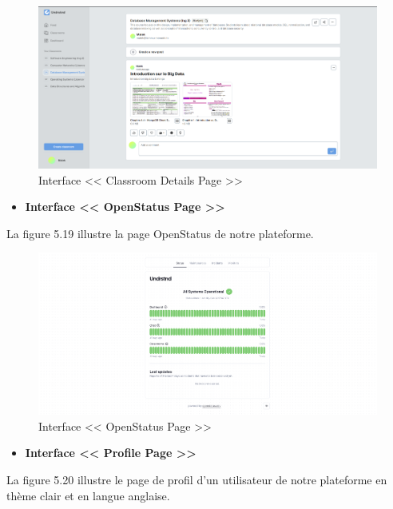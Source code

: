 \begin{figure}[H]
    \centering
    \includegraphics[width=1.1\textwidth,height=0.5\textwidth]{images/chp5/fig18.png}
    \caption{Interface << Classroom Details Page >>}
    \label{Interface << Classroom Details Page >>}    
\end{figure}
\begin{itemize}
    \item \textbf{Interface << OpenStatus Page >>}
\end{itemize}
La figure 5.19 illustre la page OpenStatus de notre plateforme.
\begin{figure}[H]
    \centering
    \includegraphics[width=1.1\textwidth,height=0.5\textwidth]{images/chp5/fig19.png}
    \caption{Interface << OpenStatus Page >>}
    \label{Interface << OpenStatus Page >>}    
\end{figure}
\begin{itemize}
    \item \textbf{Interface << Profile Page >>}
\end{itemize}
La figure 5.20 illustre le page de profil d'un utilisateur de notre plateforme en thème clair et en langue anglaise.
